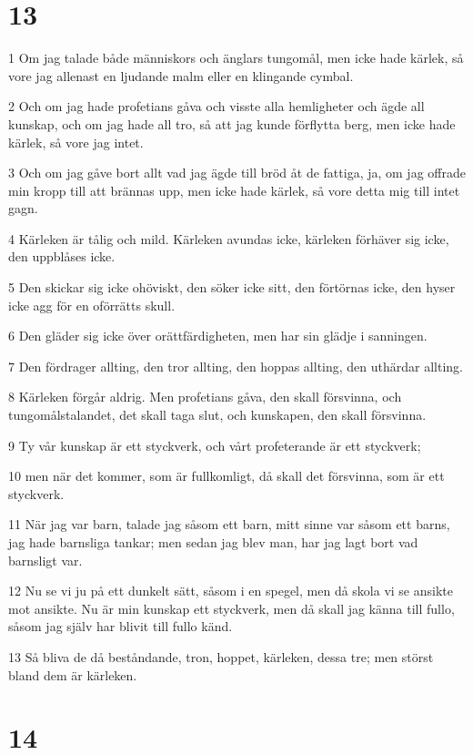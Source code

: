 \chapter{13}

\par 1 Om jag talade både människors och änglars tungomål, men icke hade kärlek, så vore jag allenast en ljudande malm eller en klingande cymbal.
\par 2 Och om jag hade profetians gåva och visste alla hemligheter och ägde all kunskap, och om jag hade all tro, så att jag kunde förflytta berg, men icke hade kärlek, så vore jag intet.
\par 3 Och om jag gåve bort allt vad jag ägde till bröd åt de fattiga, ja, om jag offrade min kropp till att brännas upp, men icke hade kärlek, så vore detta mig till intet gagn.
\par 4 Kärleken är tålig och mild. Kärleken avundas icke, kärleken förhäver sig icke, den uppblåses icke.
\par 5 Den skickar sig icke ohöviskt, den söker icke sitt, den förtörnas icke, den hyser icke agg för en oförrätts skull.
\par 6 Den gläder sig icke över orättfärdigheten, men har sin glädje i sanningen.
\par 7 Den fördrager allting, den tror allting, den hoppas allting, den uthärdar allting.
\par 8 Kärleken förgår aldrig. Men profetians gåva, den skall försvinna, och tungomålstalandet, det skall taga slut, och kunskapen, den skall försvinna.
\par 9 Ty vår kunskap är ett styckverk, och vårt profeterande är ett styckverk;
\par 10 men när det kommer, som är fullkomligt, då skall det försvinna, som är ett styckverk.
\par 11 När jag var barn, talade jag såsom ett barn, mitt sinne var såsom ett barns, jag hade barnsliga tankar; men sedan jag blev man, har jag lagt bort vad barnsligt var.
\par 12 Nu se vi ju på ett dunkelt sätt, såsom i en spegel, men då skola vi se ansikte mot ansikte. Nu är min kunskap ett styckverk, men då skall jag känna till fullo, såsom jag själv har blivit till fullo känd.
\par 13 Så bliva de då beståndande, tron, hoppet, kärleken, dessa tre; men störst bland dem är kärleken.

\chapter{14}

